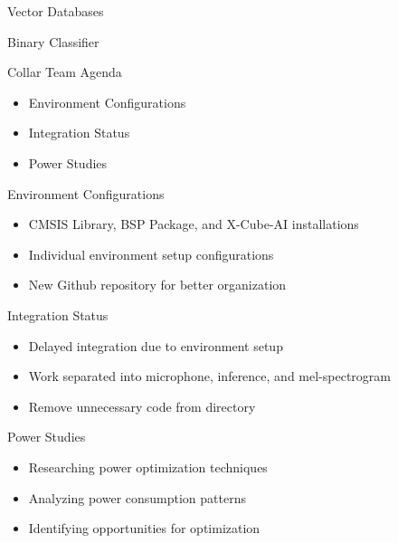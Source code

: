 \begin{frame}{Vector Databases}
    
\end{frame}

\begin{frame}{Binary Classifier}
    
\end{frame}

\begin{frame}{Collar Team Agenda}
    \begin{itemize}
        \item Environment Configurations
        \item Integration Status
        \item Power Studies
    \end{itemize}
\end{frame}

\begin{frame}{Environment Configurations}
    \begin{itemize}
        \item CMSIS Library, BSP Package, and X-Cube-AI installations
        \item Individual environment setup configurations
        \item New Github repository for better organization
    \end{itemize}
\end{frame}

\begin{frame}{Integration Status}
    \begin{itemize}
        \item Delayed integration due to environment setup
        \item Work separated into microphone, inference, and mel-spectrogram
        \item Remove unnecessary code from directory
    \end{itemize}
\end{frame}

\begin{frame}{Power Studies}
    \begin{itemize}
        \item Researching power optimization techniques
        \item Analyzing power consumption patterns
        \item Identifying opportunities for optimization
    \end{itemize}
\end{frame}


